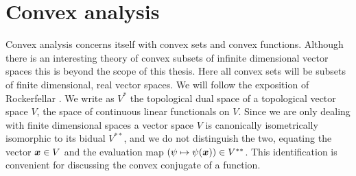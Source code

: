 \section{Convex analysis}

Convex analysis concerns itself with convex sets and convex functions. Although there is an interesting theory of convex subsets of infinite dimensional vector spaces  this is beyond the scope of this thesis. Here all convex sets will be subsets of finite dimensional, real vector spaces. We will follow the exposition of Rockerfellar \cite{rtr-conv-anal-book}. We write as $V^*$ the topological dual space of a topological vector space $V$, the space of continuous linear functionals on $V$. Since we are only dealing with finite dimensional spaces a vector space $V$ is canonically isometrically isomorphic to its bidual $V^{**}$, and we do not distinguish the two, equating the vector $\bm{x}\in V$ and the evaluation map $(\psi\mapsto\psi(\bm{x}))\in V^{**}$. This identification is convenient for discussing the convex conjugate of a function.

